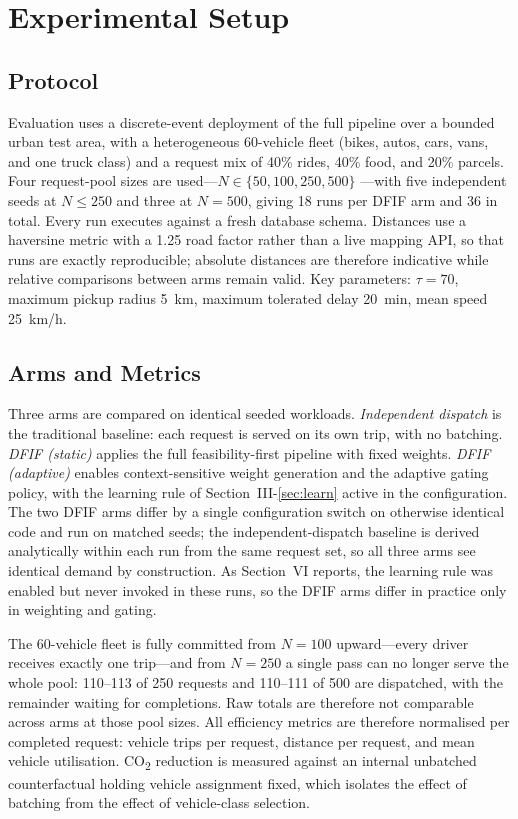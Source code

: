\documentclass[conference]{IEEEtran}
\begin{document}
\section{Experimental Setup}

\subsection{Protocol}
Evaluation uses a discrete-event deployment of the full pipeline over a
bounded urban test area, with a heterogeneous 60-vehicle fleet (bikes, autos,
cars, vans, and one truck class) and a request mix of 40\% rides, 40\% food,
and 20\% parcels. Four request-pool sizes are used---$N\in\{50,100,250,500\}$
---with five independent seeds at $N\le250$ and three at $N=500$, giving 18
runs per DFIF arm and 36 in total. Every run executes against a fresh database
schema. Distances use a haversine metric with a 1.25 road factor rather than
a live mapping API, so that runs are exactly reproducible; absolute distances
are therefore indicative while relative comparisons between arms remain
valid. Key parameters: $\tau=70$, maximum pickup radius 5~km, maximum
tolerated delay 20~min, mean speed 25~km/h.

\subsection{Arms and Metrics}
Three arms are compared on identical seeded workloads. \emph{Independent
dispatch} is the traditional baseline: each request is served on its own
trip, with no batching. \emph{DFIF (static)} applies the full
feasibility-first pipeline with fixed weights. \emph{DFIF (adaptive)}
enables context-sensitive weight generation and the adaptive gating policy,
with the learning rule of Section~III-\ref{sec:learn} active in the
configuration. The two DFIF arms differ by a single configuration switch on
otherwise identical code and run on matched seeds; the independent-dispatch
baseline is derived analytically within each run from the same request set,
so all three arms see identical demand by construction. As Section~VI
reports, the learning rule was enabled but never invoked in these runs, so
the DFIF arms differ in practice only in weighting and gating.

The 60-vehicle fleet is fully committed from $N=100$ upward---every driver
receives exactly one trip---and from $N=250$ a single pass can no longer
serve the whole pool: 110--113 of 250 requests and 110--111 of 500 are
dispatched, with the remainder waiting for completions. Raw totals are
therefore not comparable across arms at those pool sizes. All efficiency metrics are therefore normalised per completed
request: vehicle trips per request, distance per request, and mean vehicle
utilisation. CO\textsubscript{2} reduction is measured against an internal
unbatched counterfactual holding vehicle assignment fixed, which isolates the
effect of batching from the effect of vehicle-class selection.
\end{document}
